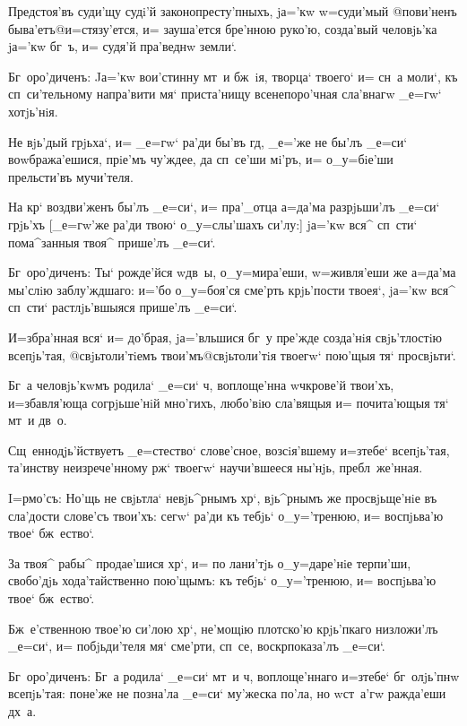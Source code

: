 Предстоя'въ суди'щу судi'й законопресту'пныхъ, jа='кw 
w=суди'мый @пови'ненъ быва'етъ@{и=стязу'ется}, и= 
зауша'ется бре'нною руко'ю, созда'вый человjь'ка jа='кw 
бг~ъ, и= судя'й пра'веднw земли`.

Бг~оро'диченъ: Jа='кw вои'стинну мт~и бж~iя, творца` 
твоего` и= сн~а моли`, къ сп~си'тельному напра'вити мя` 
приста'нищу всенепоро'чная сла'внагw _е=гw` хотjь'нiя.


Не вjь'дый грjьха`, и= _е=гw` ра'ди бы'въ гд, 
_е='же не бы'лъ _е=си` воwбража'ешися, прiе'мъ чу'ждее, 
да сп~се'ши мi'ръ, и= о_у=бiе'ши прельсти'въ мучи'теля.

На кр` воздви'женъ бы'лъ _е=си`, и= пра'_отца 
а=да'ма разрjьши'лъ _е=си` грjь'хъ [_е=гw'же ра'ди твою` 
о_у=слы'шахъ си'лу:] jа='кw вся^ сп~сти` пома^занныя 
твоя^ прише'лъ _е=си`.

Бг~оро'диченъ: Ты` рожде'йся w\т дв~ы, о_у=мира'еши, 
w=живля'еши же а=да'ма мы'слiю заблу'ждшаго: и='бо 
о_у=боя'ся сме'рть крjь'пости твоея`, jа='кw вся^ сп~сти` 
растлjь'вшыяся прише'лъ _е=си`.


И=збра'нная вся` и= до'брая, jа='вльшися бг~у пре'жде 
созда'нiя свjь'тлостiю всепjь'тая, @свjьтоли'тiемъ 
твои'мъ@{свjьтоли'тiя твоегw`} пою'щыя тя` просвjьти`.

Бг~а человjь'кwмъ родила` _е=си` ч, воплоще'нна 
w\т ч крове'й твои'хъ, и=збавля'юща согрjьше'нiй 
мно'гихъ, любо'вiю сла'вящыя и= почита'ющыя тя` мт~и 
дв~о.

Сщ~еннодjь'йствуетъ _е=стество` слове'сное, 
возсiя'вшему и=з\ъ тебе` всепjь'тая, та'инству 
неизрече'нному рж` твоегw` научи'вшееся ны'нjь, 
пребл~же'нная.


I=рмо'съ: Но'щь не свjьтла` невjь^рнымъ хр`, 
вjь^рнымъ же просвjьще'нiе въ сла'дости слове'съ твои'хъ: 
сегw` ра'ди къ тебjь` о_у='тренюю, и= воспjьва'ю твое` 
бж~ество`.

За твоя^ рабы^ продае'шися хр`, и= по лани'тjь 
о_у=даре'нiе терпи'ши, свобо'дjь хода'тайственно 
пою'щымъ: къ тебjь` о_у='тренюю, и= воспjьва'ю твое` 
бж~ество`.

Бж~е'ственною твое'ю си'лою хр`, не'мощiю 
плотско'ю крjь'пкаго низложи'лъ _е=си`, и= побjьди'теля 
мя` сме'рти, сп~се, воскр показа'лъ _е=си`.

Бг~оро'диченъ: Бг~а родила` _е=си` мт~и ч, 
воплоще'ннаго и=з\ъ тебе` бг~олjь'пнw всепjь'тая: поне'же 
не позна'ла _е=си` му'жеска по'ла, но w\т ст~а'гw 
ражда'еши дх~а.

